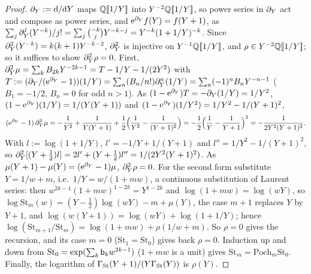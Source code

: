 \begin{proof}
$\partial_Y:=\mathrm{d}/\mathrm{d} Y$ maps $\mathbb{Q}[\![ 1/Y ]\!]$ into $Y^{-2}\mathbb{Q}[\![ 1/Y ]\!]$, so power series in $\partial_Y$ act and compose as power series, and $\mathrm{e}^{\partial_Y}f(Y)=f(Y+1)$, as $\sum_j\partial_Y^j(Y^{-k})/j!=\sum_j\binom{-k}jY^{-k-j}=Y^{-k}(1+1/Y)^{-k}$. Since $\partial_Y^2(Y^{-k})=k(k+1)Y^{-k-2}$, $\partial_Y^2$ is injective on $Y^{-1}\mathbb{Q}[\![ 1/Y ]\!]$, and $\rho\in Y^{-2}\mathbb{Q}[\![ 1/Y ]\!]$; so it suffices to show $\partial_Y^2\rho=0$. First, $\partial_Y^2\mu=\sum_kB_{2k}Y^{-2k-1}=T-1/Y-1/(2Y^2)$ with $T:=(\partial_Y/(\mathrm{e}^{\partial_Y}-1))(1/Y)=\sum_n(B_n/n!)\partial_Y^n(1/Y)=\sum_n(-1)^nB_nY^{-n-1}$ ($B_1=-1/2$, $B_n=0$ for odd $n>1$). As $(1-\mathrm{e}^{\partial_Y})T=-\partial_Y(1/Y)=1/Y^2$, $(1-\mathrm{e}^{\partial_Y})(1/Y)=1/(Y(Y+1))$ and $(1-\mathrm{e}^{\partial_Y})(1/Y^2)=1/Y^2-1/(Y+1)^2$,
\[
(\mathrm{e}^{\partial_Y}-1)\,\partial_Y^2\mu=-\frac1{Y^2}+\frac1{Y(Y+1)}+\frac12\Bigl(\frac1{Y^2}-\frac1{(Y+1)^2}\Bigr)=-\frac12\Bigl(\frac1Y-\frac1{Y+1}\Bigr)^2=-\frac1{2Y^2(Y+1)^2}.
\]
With $l:=\log(1+1/Y)$, $l'=-1/Y+1/(Y+1)$ and $l''=1/Y^2-1/(Y+1)^2$, so $\partial_Y^2[(Y+\frac12)l]=2l'+(Y+\frac12)l''=1/(2Y^2(Y+1)^2)$. As $\mu(Y+1)-\mu(Y)=(\mathrm{e}^{\partial_Y}-1)\mu$, $\partial_Y^2\rho=0$. For the second form substitute $Y=1/w+m$, i.e.\ $1/Y=w/(1+mw)$, a continuous substitution of Laurent series: then $w^{2k-1}(1+mw)^{1-2k}=Y^{1-2k}$ and $\log(1+mw)=\log(wY)$, so $\log\mathrm{St}_m(w)=(Y-\frac12)\log(wY)-m+\mu(Y)$, the case $m+1$ replaces $Y$ by $Y+1$, and $\log(w(Y+1))=\log(wY)+\log(1+1/Y)$; hence $\log(\mathrm{St}_{m+1}/\mathrm{St}_m)=\log(1+mw)+\rho(1/w+m)$. So $\rho=0$ gives the recursion, and its case $m=0$ ($\mathrm{St}_1=\mathrm{St}_0$) gives back $\rho=0$. Induction up and down from $\mathrm{St}_0=\exp(\sum_k\mathsf{b}_kw^{2k-1})$ ($1+mw$ is a unit) gives $\mathrm{St}_m=\mathrm{Poch}_m\mathrm{St}_0$. Finally, the logarithm of $\Gamma_{\mathrm{St}}(Y+1)/(Y\Gamma_{\mathrm{St}}(Y))$ is $\rho(Y)$.
\end{proof}

